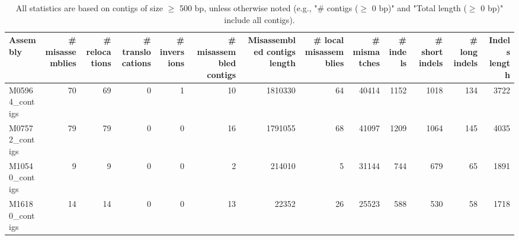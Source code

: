 \documentclass[12pt,a4paper]{article}
\begin{document}
\begin{table}[ht]
\begin{center}
\caption{All statistics are based on contigs of size $\geq$ 500 bp, unless otherwise noted (e.g., "\# contigs ($\geq$ 0 bp)" and "Total length ($\geq$ 0 bp)" include all contigs).}
\begin{tabular}{|l*{12}{|r}|}
\hline
Assembly & \# misassemblies &     \# relocations &     \# translocations &     \# inversions & \# misassembled contigs & Misassembled contigs length & \# local misassemblies & \# mismatches & \# indels &     \# short indels &     \# long indels & Indels length \\ \hline
M05964\_contigs & 70 & 69 & 0 & 1 & 10 & 1810330 & 64 & 40414 & 1152 & 1018 & 134 & 3722 \\ \hline
M07572\_contigs & 79 & 79 & 0 & 0 & 16 & 1791055 & 68 & 41097 & 1209 & 1064 & 145 & 4035 \\ \hline
M10540\_contigs & 9 & 9 & 0 & 0 & 2 & 214010 & 5 & 31144 & 744 & 679 & 65 & 1891 \\ \hline
M16180\_contigs & 14 & 14 & 0 & 0 & 13 & 22352 & 26 & 25523 & 588 & 530 & 58 & 1718 \\ \hline
\end{tabular}
\end{center}
\end{table}
\end{document}
